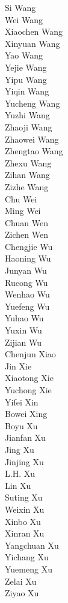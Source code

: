 Si Wang\\
Wei Wang\\
Xiaochen Wang\\
Xinyuan Wang\\
Yao Wang\\
Yejie Wang\\
Yipu Wang\\
Yiqin Wang\\
Yucheng Wang\\
Yuzhi Wang\\
Zhaoji Wang\\
Zhaowei Wang\\
Zhengtao Wang\\
Zhexu Wang\\
Zihan Wang\\
Zizhe Wang\\
Chu Wei\\
Ming Wei\\
Chuan Wen\\
Zichen Wen\\
Chengjie Wu\\
Haoning Wu\\
Junyan Wu\\
Rucong Wu\\
Wenhao Wu\\
Yuefeng Wu\\
Yuhao Wu\\
Yuxin Wu\\
Zijian Wu\\
Chenjun Xiao\\
Jin Xie\\
Xiaotong Xie\\
Yuchong Xie\\
Yifei Xin\\
Bowei Xing\\
Boyu Xu\\
Jianfan Xu\\
Jing Xu\\
Jinjing Xu\\
L.H. Xu\\
Lin Xu\\
Suting Xu\\
Weixin Xu\\
Xinbo Xu\\
Xinran Xu\\
Yangchuan Xu\\
Yichang Xu\\
Yuemeng Xu\\
Zelai Xu\\
Ziyao Xu\\
